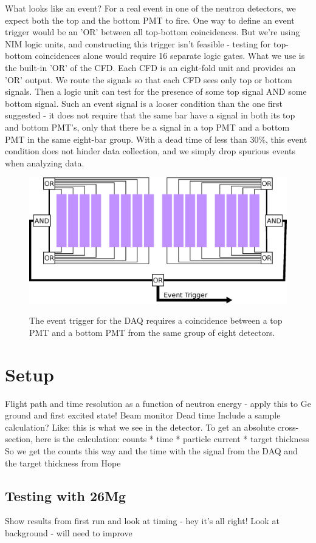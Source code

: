 What looks like an event?  For a real event in one of the neutron detectors, we expect both the top and the bottom PMT to fire.  One way to define an event trigger would be an 'OR' between all top-bottom coincidences.  But we're using NIM logic units, and constructing this trigger isn't feasible - testing for top-bottom coincidences alone would require 16 separate logic gates.  What we use is the built-in 'OR' of the CFD.  Each CFD is an eight-fold unit and provides an 'OR' output.  We route the signals so that each CFD sees only top or bottom signals.  Then a logic unit can test for the presence of some top signal AND some bottom signal.  Such an event signal is a looser condition than the one first suggested - it does not require that the same bar have a signal in both its top and bottom PMT's, only that there be a signal in a top PMT and a bottom PMT in the same eight-bar group.  With a dead time of less than 30\%, this event condition does not hinder data collection, and we simply drop spurious events when analyzing data.

\begin{figure}[ht]
\centering
\includegraphics[width=1.0\textwidth]{figures/event_trigger.eps}
\label{fig:eventTrig}
\caption{The event trigger for the DAQ requires a coincidence between a top PMT and a bottom PMT from the same group of eight detectors.}
\end{figure}


\section{Setup}
Flight path and time resolution as a function of neutron energy - apply this to Ge ground and first excited state!
Beam monitor
Dead time
Include a sample calculation?  Like: this is what we see in the detector.  To get an absolute cross-section, here is the calculation:
counts * time * particle current * target thickness
So we get the counts this way and the time with the signal from the DAQ and the target thickness from Hope



\subsection{Testing with 26Mg}
Show results from first run and look at timing - hey it's all right!
Look at background - will need to improve

%
% 
% 
